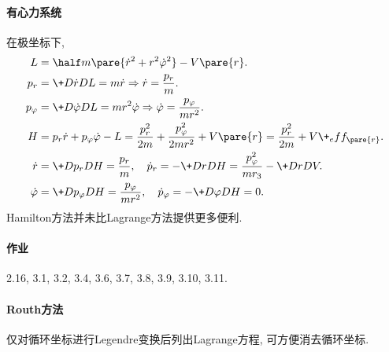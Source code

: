 \documentclass{ctexart}
\begin{document}

\paragraph{有心力系统} %
\label{par:有心力系统}

在极坐标下,
\begin{align*}
    L &= \half m\pare{\dot{r}^2 + r^2\dot{\varphi}^2} - V\pare{r}. \\
    p_r &= \+D{\dot{r}}DL = m\dot{r} \Rightarrow \dot{r} = \frac{p_r}{m}. \\
    p_\varphi &= \+D{\dot{\varphi}}DL = mr^2\dot{\varphi} \Rightarrow \dot{\varphi} = \frac{p_\varphi}{mr^2}. \\
    H &= p_r\dot{r} + p_\varphi\dot{\varphi} - L = \frac{p_r^2}{2m} + \frac{p_\varphi^2}{2mr^2} + V\pare{r} = \frac{p_r^2}{2m} + V\+_eff_\pare{r}. \\
    \dot{r} &= \+D{p_r}DH = \frac{p_r}{m},\quad \dot{p}_r = -\+DrD{H} = \frac{p_\varphi^2}{mr_3} - \+DrDV. \\
    \dot{\varphi} &= \+D{p_\varphi}DH = \frac{p_\varphi}{mr^2},\quad \dot{p}_\varphi = -\+D\varphi DH = 0.
\end{align*}
Hamilton方法并未比Lagrange方法提供更多便利.


\paragraph{作业} %
\label{par:作业}

2.16, 3.1, 3.2, 3.4, 3.6, 3.7, 3.8, 3.9, 3.10, 3.11.


\paragraph{Routh方法} %
\label{par:routh方法}

仅对循环坐标进行Legendre变换后列出Lagrange方程, 可方便消去循环坐标.




\end{document}
